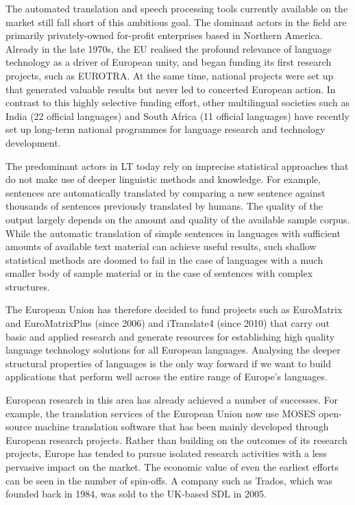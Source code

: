 \documentclass{../../metanetpaper}
\begin{document}
\begin{Parallel}[c]{79mm}{78mm}
{

The automated translation and speech processing tools currently available on
the market still fall short of this ambitious goal. The dominant actors in the
field are primarily privately-owned for-profit enterprises based in Northern
America. Already in the late 1970s, the EU realised the profound relevance of
language technology as a driver of European unity, and began funding its first
research projects, such as EUROTRA. At the same time, national projects were
set up that generated valuable results but never led to concerted European
action. In contrast to this highly selective funding effort, other multilingual
societies such as India (22 official languages) and South Africa (11 official
languages) have recently set up long-term national programmes for language
research and technology development.

The predominant actors in LT today rely on imprecise statistical approaches
that do not make use of deeper linguistic methods and knowledge. For example,
sentences are automatically translated by comparing a new sentence against
thousands of sentences previously translated by humans. The quality of the
output largely depends on the amount and quality of the available sample
corpus. While the automatic translation of simple sentences in languages with
sufficient amounts of available text material can achieve
useful results, such shallow statistical methods
are doomed to fail in the case of languages with a much smaller body of sample
material or in the case of sentences with complex
structures.

The European Union has therefore decided to fund projects such as EuroMatrix
and EuroMatrixPlus (since 2006) and iTranslate4 (since 2010) that carry out
basic and applied research and generate resources for establishing high quality
language technology solutions for all European languages. Analysing the deeper
structural properties of languages is the only way forward if we want to build
applications that perform well across the entire range of Europe’s languages.

European research in this area has already achieved a number of successes. For
example, the translation services of the European Union now use MOSES
open-source machine translation software that has been mainly developed through
European research projects. Rather than building on the outcomes of its
research projects, Europe has tended to pursue isolated research activities
with a less pervasive impact on the market. The economic value of even the
earliest efforts can be seen in the number of spin-offs. A company such as
Trados, which was founded back in 1984, was sold to the UK-based SDL in 2005.

}
\end{Parallel}
\end{document}
